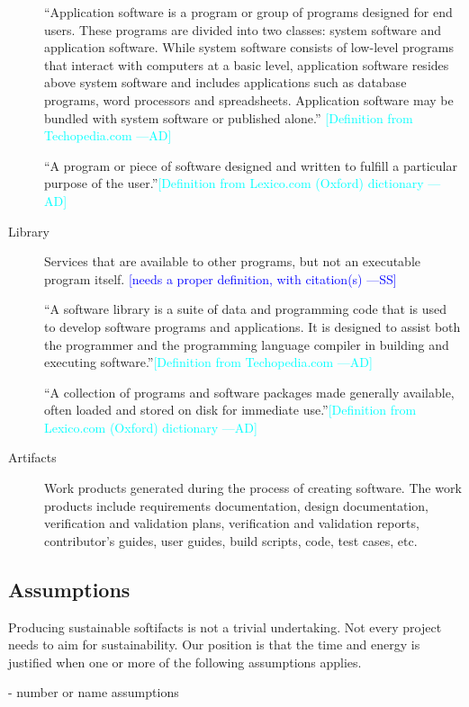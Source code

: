 \documentclass[12pt]{article}
\newcommand{\authornote}[3]{\textcolor{#1}{[#3 ---#2]}}
\newcommand{\authornote}[3]{}
\newcommand{\wss}[1]{\authornote{blue}{SS}{#1}} %
\newcommand{\ad}[1]{\authornote{cyan}{AD}{#1}} %
\begin{document}
\begin{description}
``Application software is a program or group of programs designed for end users.
These programs are divided into two classes: system software and application
software. While system software consists of low-level programs that interact
with computers at a basic level, application software resides above system
software and includes applications such as database programs, word processors
and spreadsheets. Application software may be bundled with system software or
published alone.''\citep{TechopediaApplication2018} \ad{Definition from
Techopedia.com}

``A program or piece of software designed and written to fulfill a particular
purpose of the user.''\citep{OxfordApplication2020}\ad{Definition from
Lexico.com (Oxford) dictionary}

\item[Library] Services that are available to other programs, but not an
  executable program itself. \wss{needs a
    proper definition, with citation(s)}

``A software library is a suite of data and programming code that is used to
develop software programs and applications. It is designed to assist both the
programmer and the programming language compiler in building and executing
software.''\citep{TechopediaLibrary2016}\ad{Definition from Techopedia.com}

``A collection of programs and software packages made generally available, often
loaded and stored on disk for immediate
use.''\citep{OxfordLibrary2020}\ad{Definition from Lexico.com (Oxford)
dictionary}

\item[Artifacts] Work products generated during the process of creating
  software.  The work products include requirements documentation, design
  documentation, verification and validation plans, verification and validation
  reports, contributor's guides, user guides, build scripts, code, test cases,
  etc.
\end{description}

\subsection{Assumptions}

Producing sustainable softifacts is not a trivial undertaking.  Not
every project needs to aim for sustainability.  Our position is that the time
and energy is justified when one or more of the following assumptions applies.

- number or name assumptions
\end{document}

